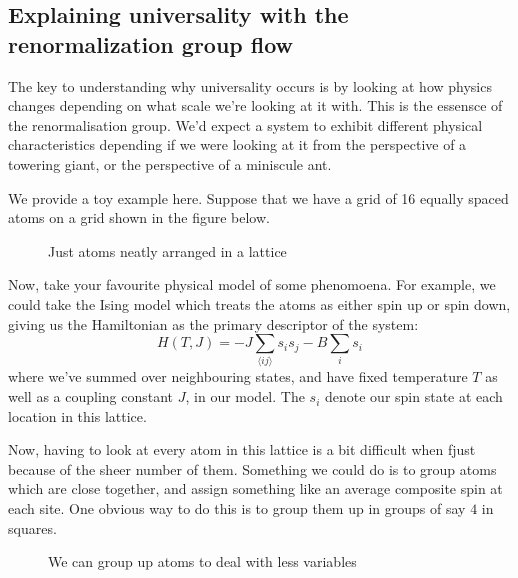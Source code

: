 \subsection{Explaining universality with the renormalization group flow} 
The key to understanding why universality occurs is by looking at how physics changes depending on what scale we're looking at it with. This is the essensce of the renormalisation group. We'd expect a system to exhibit different physical characteristics depending if we were looking at it from the perspective of a towering giant, or the perspective of a miniscule ant.  

We provide a toy example here. Suppose that we have a grid of 16 equally spaced atoms on a grid shown in the figure below. 
\begin{figure}[!h] 
	\centering 
{}
	\caption{Just atoms neatly arranged in a lattice} 
	\label{fig:atomLattice}  
\end{figure} 
Now, take your favourite physical model of some phenomoena. For example, we could take the Ising model which treats the atoms as either spin up or spin down, giving us the Hamiltonian as the primary descriptor of the system: 
\[ H(T, J ) =  - J \sum_{ \langle ij \rangle } s_i s_j  - B \sum_i s_i \] 
where we've summed over neighbouring states, and have fixed temperature $T$ as well as a coupling constant $J$, in our model. The $s_i$ denote our spin state at each location in this lattice. 

Now, having to look at every atom in this lattice is a bit difficult when fjust because of the sheer number of them. Something we could do is to group atoms which are close together, and assign something like an average composite spin at each site. One obvious way to do this is to group them up in groups of say $4$ in squares. 

\begin{figure}[!h] 
	\centering 
{}
	\qquad
{}
	
\caption{We can group up atoms to deal with less variables} 
	\label{fig:renormToy}  
\end{figure} 

